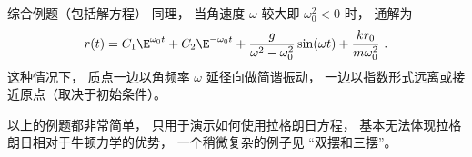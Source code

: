 \begin{example}{综合例题（包括解方程）}
同理， 当角速度 $\omega$ 较大即 $\omega_0^2 < 0$ 时， 通解为
\begin{equation}
r(t) = C_1 \E^{\omega_0 t} + C_2 \E^{-\omega_0 t} + \frac{g}{\omega^2 - \omega_0^2} \sin(\omega t) + \frac{k r_0}{m \omega_0^2}~.
\end{equation}
这种情况下， 质点一边以角频率 $\omega$ 延径向做简谐振动， 一边以指数形式远离或接近原点（取决于初始条件）。
\end{example}

以上的例题都非常简单， 只用于演示如何使用拉格朗日方程， 基本无法体现拉格朗日相对于牛顿力学的优势， 一个稍微复杂的例子见 “双摆和三摆”。
